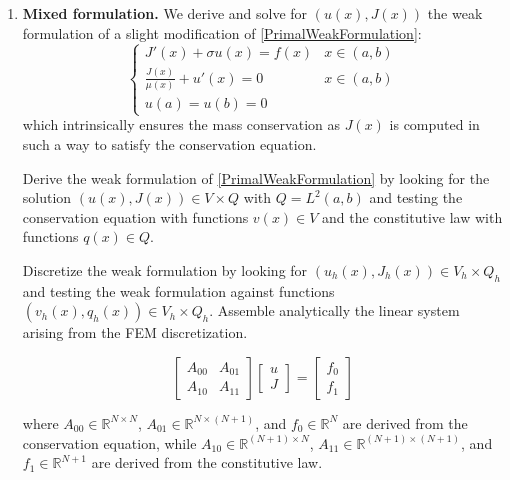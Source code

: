\documentclass{article}
\begin{document}
\begin{enumerate}[label=\alph*)]
    \item \textbf{Mixed formulation.} We derive and solve for $(u(x),J(x))$ the weak formulation of a slight modification of \eqref{PrimalWeakFormulation}:
    \begin{equation} \label{eq:mixed_strong}
        \begin{cases}
            J'(x) + \sigma u(x) = f(x) & x \in (a, b) \\
            \frac{J(x)}{\mu(x)} + u'(x) = 0 & x \in (a, b) \\
            u(a) = u(b) = 0
        \end{cases}
    \end{equation}
    which intrinsically ensures the mass conservation as $J(x)$ is computed in such a way to satisfy the conservation equation. 
    
    Derive the weak formulation of \eqref{PrimalWeakFormulation} by looking for the solution $(u(x),J(x))\in V\times Q$ with $Q=L^{2}(a,b)$ and testing the conservation equation with functions $v(x)\in V$ and the constitutive law with functions $q(x)\in Q$.
    
    Discretize the weak formulation by looking for $(u_{h}(x),J_{h}(x))\in V_{h}\times Q_{h}$ and testing the weak formulation against functions $(v_{h}(x), q_{h}(x))\in V_{h}\times Q_{h}$. Assemble analytically the linear system arising from the FEM discretization.

    \begin{equation} \label{eq:mixed_system}
        \begin{bmatrix}
            A_{00} & A_{01} \\
            A_{10} & A_{11}
        \end{bmatrix}
        \begin{bmatrix}
            u \\
            J
        \end{bmatrix}
        =
        \begin{bmatrix}
            f_0 \\
            f_1
        \end{bmatrix}
    \end{equation}
    
    where $A_{00} \in \mathbb{R}^{N \times N}$, $A_{01} \in \mathbb{R}^{N \times (N+1)}$, and $f_0 \in \mathbb{R}^N$ are derived from the conservation equation, while $A_{10} \in \mathbb{R}^{(N+1) \times N}$, $A_{11} \in \mathbb{R}^{(N+1) \times (N+1)}$, and $f_1 \in \mathbb{R}^{N+1}$ are derived from the constitutive law.
    

\end{enumerate}
\end{document}
